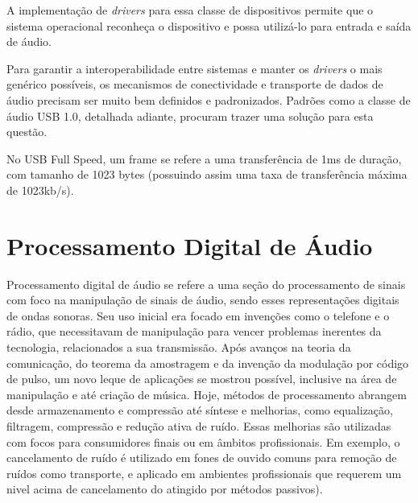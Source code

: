 



A implementação de \textit{drivers} para essa classe de dispositivos permite que o sistema operacional reconheça o dispositivo e possa utilizá-lo para entrada e saída de áudio. 

Para garantir a interoperabilidade entre sistemas e manter os \textit{drivers} o mais genérico possíveis, os mecanismos de conectividade e transporte de dados de áudio precisam ser muito bem definidos e padronizados.  Padrões como a classe de áudio USB 1.0, detalhada adiante, procuram trazer uma solução para esta questão.





No USB Full Speed, um frame se refere a uma transferência de 1ms de duração, com tamanho de 1023 bytes (possuindo assim uma taxa de transferência máxima de 1023kb/s).




\section{Processamento Digital de Áudio}
Processamento digital de áudio se refere a uma seção do processamento de sinais com foco na manipulação de sinais de áudio, sendo esses representações digitais de ondas sonoras.
Seu uso inicial era focado em invenções como o telefone e o rádio, que necessitavam de manipulação para vencer problemas inerentes da tecnologia, relacionados a sua transmissão.
Após avanços na teoria da comunicação, do teorema da amostragem e da invenção da modulação por código de pulso, um novo leque de aplicações se mostrou possível, inclusive na área de manipulação e até criação de música.
Hoje, métodos de processamento abrangem desde armazenamento e compressão até síntese e melhorias, como equalização, filtragem, compressão e redução ativa de ruído. Essas melhorias são utilizadas com focos para consumidores finais ou em âmbitos profissionais. Em exemplo, o cancelamento de ruído é utilizado em fones de ouvido comuns para remoção de ruídos como transporte, e aplicado em ambientes profissionais que requerem um nivel acima de cancelamento do atingido por métodos passivos).

